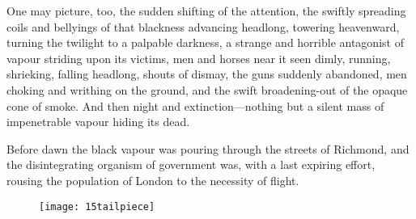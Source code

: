 One may picture, too, the sudden shifting of the attention, the swiftly spreading coils and bellyings of that blackness advancing headlong, towering heavenward, turning the twilight to a palpable darkness, a strange and horrible antagonist of vapour striding upon its victims, men and horses near it seen dimly, running, shrieking, falling headlong, shouts of dismay, the guns suddenly abandoned, men choking and writhing on the ground, and the swift broadening-out of the opaque cone of smoke. And then night and extinction—nothing but a silent mass of impenetrable vapour hiding its dead.

Before dawn the black vapour was pouring through the streets of Richmond, and the disintegrating organism of government was, with a last expiring effort, rousing the population of London to the necessity of flight.

\begin{figure}[b!]
\centering
\texttt{[image: 15tailpiece]}
\end{figure}
\enlargethispage{\baselineskip}